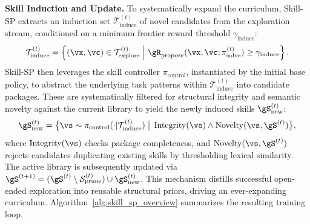 \textbf{Skill Induction and Update.}
To systematically expand the curriculum, Skill-SP extracts an induction set $\mathcal{T}^{(t)}_{\text{induce}}$ of novel candidates from the exploration stream, conditioned on a minimum frontier reward threshold $\gamma_{\text{induce}}$:
\begin{equation}
    \mathcal{T}^{(t)}_{\text{induce}} = \left\{ (\vx,\vc) \in \mathcal{T}_{\text{explore}}^{(t)} \;\middle|\; \gR_{\text{propose}}(\vx,\vc;\pi_{\text{solve}}^{(t)}) \ge \gamma_{\text{induce}} \right\}.
\end{equation}
Skill-SP then leverages the skill controller $\pi_{\text{control}}$, instantiated by the initial base policy, to abstract the underlying task patterns within $\mathcal{T}^{(t)}_{\text{induce}}$ into candidate packages. These are systematically filtered for structural integrity and semantic novelty against the current library to yield the newly induced skills $\gS_{\text{new}}^{(t)}$:
\begin{equation}
    \gS_{\text{new}}^{(t)} = \big\{ \vs \sim \pi_{\text{control}}( \cdot | \mathcal{T}^{(t)}_{\text{induce}}) \;\big|\; \operatorname{Integrity}(\vs) \wedge \operatorname{Novelty}(\vs, \gS^{(t)}) \big\},
\end{equation}
where $\operatorname{Integrity}(\vs)$ checks package completeness, and $\operatorname{Novelty}(\vs,\gS^{(t)})$ rejects candidates duplicating existing skills by thresholding lexical similarity.
The active library is subsequently updated via $\gS^{(t+1)} = (\gS^{(t)} \setminus \mathcal{S}_{\text{prune}}^{(t)}) \cup \gS_{\text{new}}^{(t)}$. This mechanism distills successful open-ended exploration into reusable structural priors, driving an ever-expanding curriculum. Algorithm~\ref{alg:skill_sp_overview} summarizes the resulting training loop.



